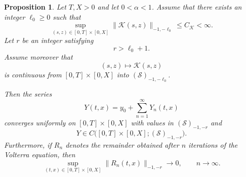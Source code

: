 \documentclass[10pt,a4paper]{amsart}
\newtheorem{proposition}{Proposition}
\begin{document}
\begin{proposition}
Let $T,X>0$ and let $0<\alpha<1$. Assume that there exists an integer
$\ell_0\geq 0$ such that
\begin{equation}
\sup_{(s,z)\in[0,T]\times[0,X]}
\|\mathcal K(s,z)\|_{-1,-\ell_0}
\leq C_{\mathcal K}<\infty.
\label{eq:K-bound}
\end{equation}
Let $r$ be an integer satisfying
\begin{equation}
r>\ell_0+1.
\label{eq:r-condition}
\end{equation}
Assume moreover that
\[
(s,z)\longmapsto \mathcal K(s,z)
\]
is continuous from $[0,T]\times[0,X]$ into
$(\mathcal S)_{-1,-\ell_0}$.

Then the series
\begin{equation}
Y(t,x)=y_0+\sum_{n=1}^{\infty}Y_n(t,x)
\label{eq:Y-series}
\end{equation}
converges uniformly on $[0,T]\times[0,X]$ with values in
$(\mathcal S)_{-1,-r}$ and
\begin{equation}
Y\in
C\big([0,T]\times[0,X];(\mathcal S)_{-1,-r}\big).
\end{equation}
Furthermore, if $R_n$ denotes the remainder obtained after $n$ iterations
of the Volterra equation, then
\begin{equation}
\sup_{(t,x)\in[0,T]\times[0,X]}
\|R_n(t,x)\|_{-1,-r}
\longrightarrow0,
\qquad n\to\infty.
\end{equation}
\end{proposition}
\end{document}
